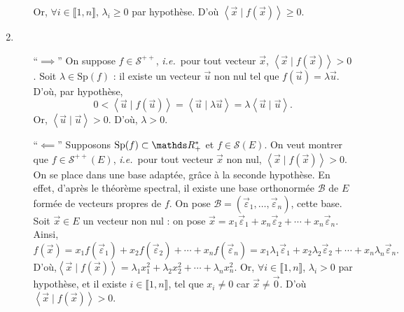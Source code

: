 \begin{prv}
\begin{enumerate}
\begin{itemize}
					Or, $\forall i \in \llbracket 1,n \rrbracket$, $\lambda_i \ge 0$\/ par hypothèse.
					D'où  $\left<\vec{x}  \mid f(\vec{x}) \right> \ge 0$.
			\end{itemize}
		\item
			\begin{itemize}
				\item[``$\implies$'']
					On suppose $f \in \mathcal{S}^{++}$, \textit{i.e.}\ pour tout vecteur $\vec{x}$, $\left<\vec{x}  \mid f(\vec{x}) \right> > 0$.
					Soit $\lambda \in \mathrm{Sp}(f)$ : il existe un vecteur $\vec{u}$\/ non nul tel que $f(\vec{u}) = \lambda \vec{u}$.
					D'où, par hypothèse, \[
						0 < \left< \vec{u}  \mid f(\vec{u}) \right> = \left<\vec{u}  \mid \lambda \vec{u} \right> = \lambda \left<\vec{u} \mid \vec{u} \right>
					.\]
					Or, $\left<\vec{u}  \mid \vec{u} \right> > 0$.
					D'où, $\lambda > 0$.
				\item[``$\impliedby$'']
					Supposons $\Sp(f) \subset \R^*_+$\/ et $f \in \mathcal{S}(E)$.
					On veut montrer que $f \in \mathcal{S}^{++}(E)$, \textit{i.e.}\ pour tout vecteur $\vec{x}$ non nul, $\left<\vec{x}  \mid f(\vec{x}) \right> > 0$.
					On se place dans une base adaptée, grâce à la seconde hypothèse.
					En effet, d'après le théorème spectral, il existe une base orthonormée $\mathcal{B}$\/ de $E$\/ formée de vecteurs propres de $f$.
					On pose $\mathcal{B} = (\vec{\varepsilon}_1, \ldots, \vec{\varepsilon}_n)$, cette base.
					Soit $\vec{x} \in E$ un vecteur non nul : on pose $\vec{x} = x_1 \vec{\varepsilon}_1 + x_n \vec{\varepsilon}_2 + \cdots + x_n \vec{\varepsilon}_n$.
					Ainsi, \[
						f(\vec{x}) = x_1 f(\vec{\varepsilon}_1) + x_2 f(\vec{\varepsilon}_2) + \cdots + x_n f(\vec{\varepsilon}_n)
						= x_1 \lambda_1 \vec{\varepsilon}_1 + x_2 \lambda_2 \vec{\varepsilon}_2 + \cdots + x_n \lambda_n \vec{\varepsilon}_n
					.\]
					D'où,$\left<\vec{x}  \mid f(\vec{x}) \right> = \lambda_1x_1^2 + \lambda_2 x_2^2 + \cdots + \lambda_n x_n^2$.
					Or, $\forall i \in \llbracket 1,n \rrbracket$, $\lambda_i > 0$\/ par hypothèse, et il existe $i \in \llbracket 1,n \rrbracket$, tel que $x_i \neq 0$\/ car $\vec{x} \neq \vec{0}$.
					D'où  $\left<\vec{x}  \mid f(\vec{x}) \right> > 0$.
			\end{itemize}
	\end{enumerate}
\end{prv}
